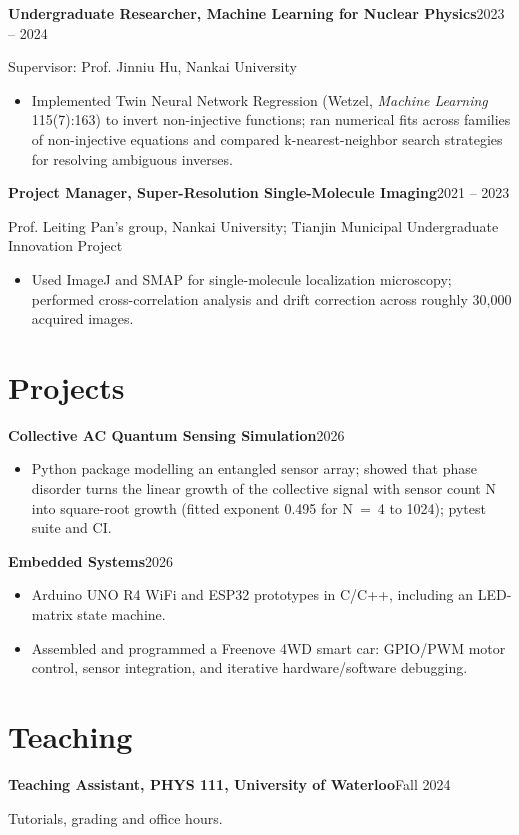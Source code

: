 \documentclass[11pt,letterpaper]{article}
\newcommand{\entry}[2]{\par\noindent\textbf{#1}\hfill #2\par}
\begin{document}
\entry{Undergraduate Researcher, Machine Learning for Nuclear Physics}{2023 -- 2024}
Supervisor: Prof. Jinniu Hu, Nankai University
\begin{itemize}
  \item Implemented Twin Neural Network Regression (Wetzel, \textit{Machine Learning} 115(7):163) to invert
        non-injective functions; ran numerical fits across families of non-injective equations and compared
        k-nearest-neighbor search strategies for resolving ambiguous inverses.
\end{itemize}

\entry{Project Manager, Super-Resolution Single-Molecule Imaging}{2021 -- 2023}
Prof. Leiting Pan's group, Nankai University; Tianjin Municipal Undergraduate Innovation Project
\begin{itemize}
  \item Used ImageJ and SMAP for single-molecule localization microscopy; performed cross-correlation
        analysis and drift correction across roughly 30{,}000 acquired images.
\end{itemize}

\section{Projects}
\entry{Collective AC Quantum Sensing Simulation}{2026}
\begin{itemize}
  \item Python package modelling an entangled sensor array; showed that phase disorder turns the linear growth of the
        collective signal with sensor count N into square-root growth (fitted exponent 0.495 for N~=~4 to 1024); pytest suite and CI.
\end{itemize}
\entry{Embedded Systems}{2026}
\begin{itemize}
  \item Arduino UNO R4 WiFi and ESP32 prototypes in C/C++, including an LED-matrix state machine.
  \item Assembled and programmed a Freenove 4WD smart car: GPIO/PWM motor control, sensor integration, and
        iterative hardware/software debugging.
\end{itemize}

\section{Teaching}
\entry{Teaching Assistant, PHYS 111, University of Waterloo}{Fall 2024}
Tutorials, grading and office hours.
\end{document}

